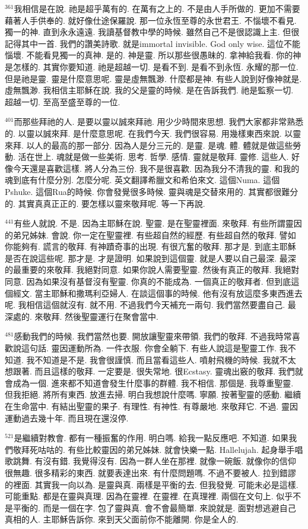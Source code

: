 \documentclass{book}
\begin{document}
$^{361}$我相信是在說.
祂是超乎萬有的.
在萬有之上的.
不是由人手所做的.
更加不需要藉著人手供奉的.
就好像仕途保羅說.
那一位永恆至尊的永世君王.
不惱壞不看見.
獨一的神.
直到永永遠遠.
我讀基督教中學的時候.
雖然自己不是很認識上主.
但很記得其中一首.
我們的讚美詩歌.
就是immortal invisible.
God only wise.
這位不能惱壞.
不能看見獨一的真神.
是的.
神是靈.
所以那些很愚昧的.
拿神給我看.
你的神是怎樣的.
其實你要知道.
祂是超越一切.
是看不到.
是看不到永恆.
永耀的那一位.
但是祂是靈.
靈是什麼意思呢.
靈是虛無飄渺.
什麼都是神.
有些人說到好像神就是.
虛無飄渺.
我相信主耶穌在說.
我的父是靈的時候.
是在告訴我們.
祂是監察一切.
超越一切.
至高至盛至尊的一位.

$^{401}$而那些拜祂的人.
是要以靈以誠來拜祂.
用少少時間來思想.
我們大家都非常熟悉的.
以靈以誠來拜.
是什麼意思呢.
在我們今天.
我們很容易.
用幾樣東西來說.
以靈來拜.
以人的最高的那一部分.
因為人是分三元的.
是靈.
是魂.
體.
體就是做這些勞動.
活在世上.
魂就是做一些美術.
思考.
哲學.
感情.
靈就是敬拜.
靈修.
這些人.
好像今天還是喜歡這樣.
將人分為三份.
我不是很喜歡.
因為我分不清我的靈.
和我的魂到底有什麼分別.
怎麼分呢.
英文翻譯希臘文和希伯來文.
這個Numa.
這個Pshuke.
這個Rua的時候.
你會發覺很多時候.
靈與魂是交替來用的.
其實都很難分的.
其實真真正正的.
要怎樣以靈來敬拜呢.
等一下再說.

$^{441}$有些人就說.
不是.
因為主耶穌在說.
聖靈.
是在聖靈裡面.
來敬拜.
有些所謂靈因的弟兄姊妹.
會說.
你一定在聖靈裡.
有些超自然的經歷.
有些超自然的敬拜.
譬如你能夠有.
謊言的敬拜.
有神蹟奇事的出現.
有很亢奮的敬拜.
那才是.
到底主耶穌是否在說這些呢.
那才是.
才是證明.
如果說到這個靈.
就是人要以自己最深.
最深的最重要的來敬拜.
我絕對同意.
如果你說人需要聖靈.
然後有真正的敬拜.
我絕對同意.
因為如果沒有基督沒有聖靈.
你真的不能成為.
一個真正的敬拜者.
但到底這個經文.
當主耶穌和撒瑪利亞婦人.
在談這個事的時候.
他有沒有放這麼多東西進去呢.
我相信這個就沒有.
就不用.
不過我們今天補充一兩句.
我們當然要盡自己.
最深處的.
來敬拜.
然後聖靈運行在聚會當中.

$^{481}$感動我們的時候.
我們當然也要.
開放讓聖靈來帶領.
我們的敬拜.
不過我時常喜歡說這句話.
靈因運動所為.
一件衣服.
你會全躺下.
有些人說這是聖靈工作.
我不知道.
我不知道是不是.
我會很謹慎.
而且當看這些人.
噴射飛機的時候.
我就不太想跟著.
而且這樣的敬拜.
一定要是.
很失常地.
很Ecstasy.
靈魂出竅的敬拜.
我們就會成為一個.
進來都不知道會發生什麼事的群體.
我不相信.
那個是.
我尊重聖靈.
但我拒絕.
將所有東西.
放進去掃.
明白我想說什麼嗎.
寧願.
按著聖靈的感動.
繼續在生命當中.
有結出聖靈的果子.
有理性.
有神性.
有尊嚴地.
來敬拜它.
不過.
靈因運動過去幾十年.
而且現在還沒停.

$^{521}$是繼續對教會.
都有一種振奮的作用.
明白嗎.
給我一點反應吧.
不知道.
如果我們敬拜死咕咕的.
有些比較靈因的弟兄姊妹.
就會快樂一點.
Hallelujah.
起身舉手唱歌跳舞.
有沒有錯.
我覺得沒有.
因為一群人坐在那裡.
就像一碗飯.
就像你的信仰很無趣.
很多精彩的東西.
就要表達出來.
有什麼問題嗎.
不過不要被人.
拉到錯謬的裡面.
其實我一向以為.
是靈與真.
兩樣是平衡的去.
但我發覺.
可能未必是這樣.
可能重點.
都是在靈與真理.
因為在靈裡.
在靈裡.
在真理裡.
兩個在文句上.
似乎不是平衡的.
而是一個在字.
包了靈與真.
會不會最簡單.
來說就是.
面對想逃避自己真相的人.
主耶穌告訴你.
來到天父面前你不能離開.
你是全人的.
\end{document}
